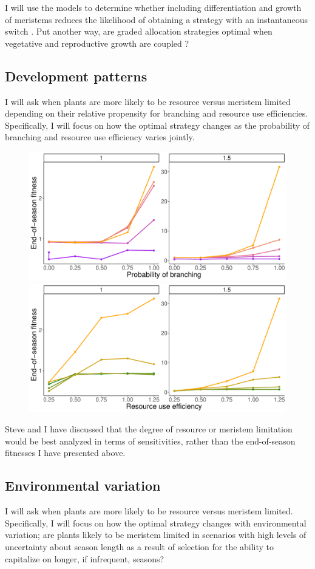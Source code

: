 \documentclass[12pt, oneside,titlepage]{article}   	%
\begin{document}
I will use the models to determine whether including differentiation and growth of meristems reduces the likelihood of obtaining a strategy with an instantaneous switch \cite{cohen1971}. Put another way, are graded allocation strategies optimal when vegetative and reproductive growth are coupled \cite{fox1992a}?

\subsection{Development patterns}

I will ask when plants are more likely to be resource versus meristem limited depending on their relative propensity for branching and resource use efficiencies. Specifically, I will focus on how the optimal strategy changes as the probability of branching and resource use efficiency varies jointly.

 \begin{figure}[!h]
       \includegraphics[page=1,width=.5\textwidth]{../figures/resources2.pdf}  
       \includegraphics[page=1,width=.5\textwidth]{../figures/resources3.pdf}  
\end{figure}

Steve and I have discussed that the degree of resource or meristem limitation would be best analyzed in terms of sensitivities, rather than the end-of-season fitnesses I have presented above. 

\subsection{Environmental variation}

I will ask when plants are more likely to be resource versus meristem limited. Specifically, I will focus on how the optimal strategy changes with environmental variation; are plants likely to be meristem limited in scenarios with high levels of uncertainty about season length as a result of selection for the ability to capitalize on longer, if infrequent, seasons?
\end{document}
